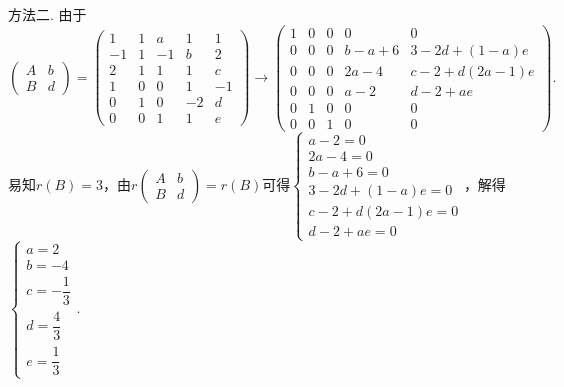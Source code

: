 \begin{exercise}
\begin{exgroup}
\begin{answer}
        方法二. 由于
        \[\begin{pmatrix}
                A & b \\
                B & d
            \end{pmatrix}=
            \begin{pmatrix}
                1  & 1 & a  & 1  & 1  \\
                -1 & 1 & -1 & b  & 2  \\
                2  & 1 & 1  & 1  & c  \\
                1  & 0 & 0  & 1  & -1 \\
                0  & 1 & 0  & -2 & d  \\
                0  & 0 & 1  & 1  & e
            \end{pmatrix}\rightarrow
            \begin{pmatrix}
                1 & 0 & 0 & 0     & 0            \\
                0 & 0 & 0 & b-a+6 & 3-2d+(1-a)e  \\
                0 & 0 & 0 & 2a-4  & c-2+d(2a-1)e \\
                0 & 0 & 0 & a-2   & d-2+ae       \\
                0 & 1 & 0 & 0     & 0            \\
                0 & 0 & 1 & 0     & 0
            \end{pmatrix}.\]
        易知$r(B)=3$，由$r\begin{pmatrix}
                A & b \\
                B & d
            \end{pmatrix}=r(B)$可得$\begin{cases}
                a-2=0          \\
                2a-4=0         \\
                b-a+6=0        \\
                3-2d+(1-a)e=0  \\
                c-2+d(2a-1)e=0 \\
                d-2+ae=0
            \end{cases}$，解得$\begin{cases}
                a=2          \\
                b=-4         \\
                c=-\dfrac 13 \\[1ex]
                d=\dfrac 43  \\[1ex]
                e=\dfrac 13
            \end{cases}$.
        \end{answer}


\end{exgroup}
\end{exercise}
